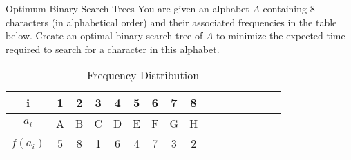 \documentclass{article}
\numberwithin{table}{section}
\numberwithin{figure}{section}
\begin{document}
\begin{section}{Optimum Binary Search Trees}
You are given an alphabet $A$ containing 8 characters (in alphabetical order) and their associated frequencies in the table below. Create an optimal binary search tree of $A$ to minimize the expected time required to search for a character in this alphabet.

\begin{table}[h]
    \centering
    \begin{tabular}{|c|c|c|c|c|c|c|c|c|c|c|c|c|c|c|c|}
         \hline
         i & 1 & 2 & 3 & 4 & 5 & 6 & 7 & 8 \\
         \hline
         $a_i$ & A & B & C & D & E & F & G & H \\
         \hline
         $f(a_i)$ & 5 & 8 & 1 & 6 & 4 & 7 & 3 & 2 \\
         \hline
    \end{tabular}
    \caption{Frequency Distribution}
    \label{tab:p2}
\end{table}


\end{section}
\end{document}
